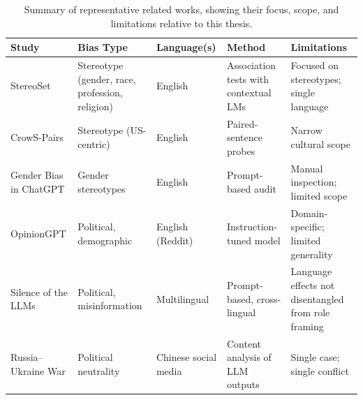 \begin{table}[h]
\centering
\small
\renewcommand{\arraystretch}{1.2}
\begin{tabularx}{\textwidth}{lYYYY}
\toprule
\textbf{Study} & \textbf{Bias Type} & \textbf{Language(s)} & \textbf{Method} & \textbf{Limitations} \\
\midrule
StereoSet \parencite{stereoset2021} & Stereotype (gender, race, profession, religion) & English & Association tests with contextual LMs & Focused on stereotypes; single language \\
CrowS\mbox{-}Pairs \parencite{crows2020pairs} & Stereotype (US\mbox{-}centric) & English & Paired\mbox{-}sentence probes & Narrow cultural scope \\
Gender Bias in ChatGPT \parencite{gender_gpt2023} & Gender stereotypes & English & Prompt\mbox{-}based audit & Manual inspection; limited scope \\
OpinionGPT \parencite{opiniongpt2023} & Political, demographic & English (Reddit) & Instruction-tuned model & Domain\mbox{-}specific; limited generality \\
Silence of the LLMs \parencite{silence_llms2023} & Political, misinformation & Multilingual & Prompt\mbox{-}based, cross\mbox{-}lingual & Language effects not disentangled from role framing \\
Russia--Ukraine War \parencite{russia_china_war2024} & Political neutrality & Chinese social media & Content analysis of LLM outputs & Single case; single conflict \\
\bottomrule
\end{tabularx}
\caption{Summary of representative related works, showing their focus, scope, and limitations relative to this thesis.}
\label{tab:relatedworks}
\end{table}
